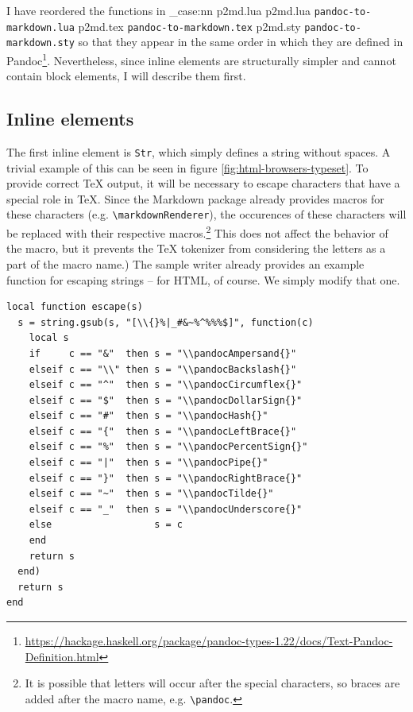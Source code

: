 \documentclass[
  digital,     %
  oneside,     %
  nosansbold,  %
  nocolorbold, %
  lof,         %
  nolot,       %
]{fithesis4}
\newcommand\macro[1]{\texttt{\textbackslash{}{#1}}}
\newcommand\pandoc[1]{\macro{pandoc\-{#1}}}
\newcommand\renderer[1]{\macro{markdown\-Renderer\-{#1}}}
\newcommand\file[1]
  {
    \str_case:nn
      { #1 }
      {
        { p2md.lua } { \texttt{pandoc\hyp{}to\hyp{}markdown.lua} }
        { p2md.tex } { \texttt{pandoc\hyp{}to\hyp{}markdown.tex} }
        { p2md.sty } { \texttt{pandoc\hyp{}to\hyp{}markdown.sty} }
      }
  }
\begin{document}
I have reordered the functions in \file{p2md.lua} so that they appear in the same order in which they are defined in Pandoc\footnote{\url{https://hackage.haskell.org/package/pandoc-types-1.22/docs/Text-Pandoc-Definition.html}}. Nevertheless, since inline elements are structurally simpler and cannot contain block elements, I will describe them first.

\subsection{Inline elements}

The first inline element is \texttt{Str}, which simply defines a string without spaces. A trivial example of this can be seen in figure \ref{fig:html-browsers-typeset}. To provide correct \TeX{} output, it will be necessary to escape characters that have a special role in \TeX{}. Since the Markdown package already provides macros for these characters (e.g. \renderer{Backslash}), the occurences of these characters will be replaced with their respective macros.\footnote{It is possible that letters will occur after the special characters, so braces are added after the macro name, e.g. \pandoc{Backslash\{\}}.} This does not affect the behavior of the macro, but it prevents the \TeX{} tokenizer from considering the letters as a part of the macro name.) The sample writer already provides an example function for escaping strings -- for HTML, of course. We simply modify that one.

\noindent
\lstset{language=[5.3]Lua}
\begin{lstlisting}
local function escape(s)
  s = string.gsub(s, "[\\{}%|_#&~%^%%%$]", function(c)
    local s
    if     c == "&"  then s = "\\pandocAmpersand{}"
    elseif c == "\\" then s = "\\pandocBackslash{}"
    elseif c == "^"  then s = "\\pandocCircumflex{}"
    elseif c == "$"  then s = "\\pandocDollarSign{}"
    elseif c == "#"  then s = "\\pandocHash{}"
    elseif c == "{"  then s = "\\pandocLeftBrace{}"
    elseif c == "%"  then s = "\\pandocPercentSign{}"
    elseif c == "|"  then s = "\\pandocPipe{}"
    elseif c == "}"  then s = "\\pandocRightBrace{}"
    elseif c == "~"  then s = "\\pandocTilde{}"
    elseif c == "_"  then s = "\\pandocUnderscore{}"
    else                  s = c
    end
    return s
  end)
  return s
end
\end{lstlisting}
\end{document}
